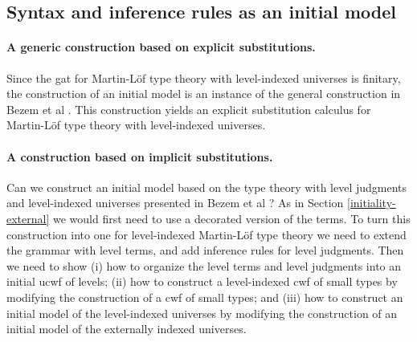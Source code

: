 \documentclass[11pt,a4paper]{article}
\theoremstyle{definition}
\begin{document}
\subsection{Syntax and inference rules as an initial model}\label{initiality-internal}

\paragraph{A generic construction based on explicit substitutions.} Since the gat for Martin-Löf type theory with level-indexed universes is finitary, the construction of an initial model is an instance of the general construction in Bezem et al
\cite{bezem:hofmann}. This construction yields an explicit substitution calculus for Martin-Löf type theory with level-indexed universes.

\paragraph{A construction based on implicit substitutions.} Can we construct an initial model based on the type theory with level judgments and level-indexed universes presented in Bezem et al \cite{BezemCDE22}? As in Section \ref{initiality-external} we would first need to use a decorated version of the terms. To turn this construction into one for level-indexed Martin-Löf type theory we need to extend the grammar with level terms, and add inference rules for level judgments. Then we need to show (i) how to organize the level terms and level judgments into an initial ucwf of levels; (ii) how to construct a level-indexed cwf of small types by modifying the construction of a cwf of small types; and (iii) how to construct an initial model of the level-indexed universes by modifying the construction of an initial model of the externally indexed universes.
\end{document}
